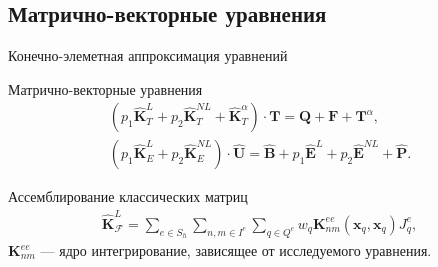 \subsection{Матрично-векторные уравнения}
\begin{frame}{Конечно-элеметная аппроксимация уравнений}
	\justifying
	
	Матрично-векторные уравнения
	\begin{gather*}
		\left( p_1 \widehat{\textbf{K}}^L_T + p_2 \widehat{\textbf{K}}^{NL}_T + \widehat{\textbf{K}}^{\alpha}_T \right) \cdot \textbf{T} = \textbf{Q} + \textbf{F} + \textbf{T}^{\alpha}, \\
		\left( p_1 \widehat{\textbf{K}}^L_E + p_2 \widehat{\textbf{K}}^{NL}_E \right) \cdot \widehat{\textbf{U}} = \widehat{\textbf{B}} + p_1 \widehat{\textbf{E}}^L + p_2 \widehat{\textbf{E}}^{NL} + \widehat{\textbf{P}}.
	\end{gather*}
	
	Ассемблирование классических матриц
	\begin{gather*}
		\widehat{\textbf{K}}^L_{\mathcal{F}} =
		\sum\limits_{e \in S_h}
		\sum\limits_{n,m \in I^e}
		\sum\limits_{q \in Q^e}
		w_q \textbf{K}^{ee}_{nm} (\boldsymbol{x}_q, \boldsymbol{x}_q) J_q^e,
	\end{gather*}
	$\textbf{K}^{ee}_{nm}$ --- ядро интегрирование, зависящее от исследуемого \mbox{уравнения.}
\end{frame}

